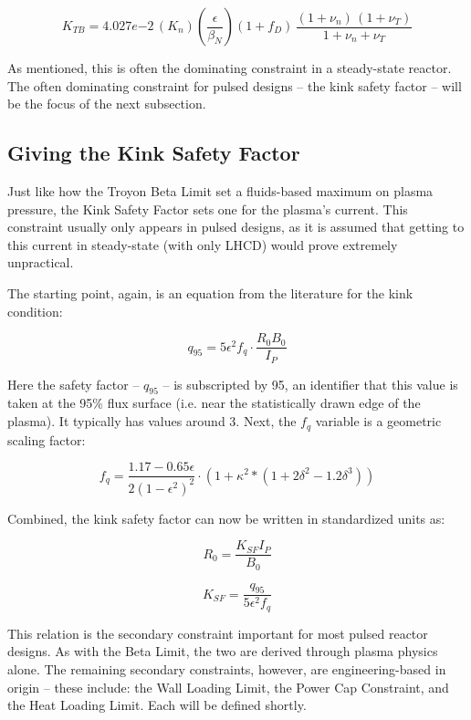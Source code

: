 \begin{equation}
  K_{TB} = 4.027e{-2} \, ( K_n ) \left( \frac{\epsilon}{\beta_N} \right)  ( 1 + f_D ) \, \frac{ (1 + \nu_n) \, (1 + \nu_T) }{1 + \nu_n + \nu_T }
\end{equation}

As mentioned, this is often the dominating constraint in a steady-state reactor. The often dominating constraint for pulsed designs -- the kink safety factor -- will be the focus of the next subsection.

\subsection{Giving the Kink Safety Factor}

Just like how the Troyon Beta Limit set a fluids-based maximum on plasma pressure, the Kink Safety Factor sets one for the plasma's current. This constraint usually only appears in pulsed designs, as it is assumed that getting to this current in steady-state (with only LHCD) would prove extremely unpractical.

The starting point, again, is an equation from the literature for the kink condition:

\begin{equation}
	q_{95} = 5 \epsilon^2 f_q \cdot  \frac{ R_0 B_0 }{ I_P }
\end{equation}

Here the safety factor -- $q_{95}$ -- is subscripted by 95, an identifier that this value is taken at the 95\% flux surface (i.e. near the statistically drawn edge of the plasma). It typically has values around 3. Next, the $f_q$ variable is a geometric scaling factor:

\begin{equation}
  f_q = \frac{1.17 - 0.65 \epsilon}{2 ( 1 - \epsilon^2 )^2} \cdot  \left( 1 + \kappa^2 * ( 1 + 2 \delta^2 - 1.2 \delta^3 ) \right)
\end{equation}

Combined, the kink safety factor can now be written in standardized units as:

\begin{equation}
   R_0 = \frac{ K_{SF} I_P }{ B_0 }
\end{equation}

\begin{equation}
  K_{SF} = \frac{q_{95}}{5 \epsilon^2 f_q}
\end{equation}

This relation is the secondary constraint important for most pulsed reactor designs. As with the Beta Limit, the two are derived through plasma physics alone. The remaining secondary constraints, however, are engineering-based in origin -- these include: the Wall Loading Limit, the Power Cap Constraint, and the Heat Loading Limit. Each will be defined shortly.

